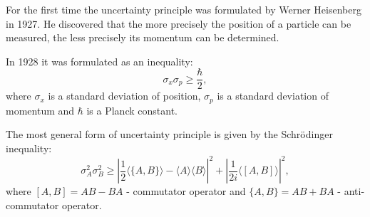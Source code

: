 \documentclass[%
master,         %
subf,           %
href,           %
colorlinks=true %
]{disser}
\numberwithin{equation}{section}
\numberwithin{figure}{section}
\begin{document}
For the first time the uncertainty principle was formulated by Werner Heisenberg in 1927. He discovered that the more precisely the position of a particle can be measured, the less precisely its momentum can be determined.

In 1928 it was formulated as an inequality:
\[
\sigma_x\sigma_p \geq \frac{\hbar}{2},
\]
where $\sigma_x$ is a standard deviation of position, $\sigma_p$ is a standard deviation of momentum and $\hbar$ is a Planck constant.

The most general form of uncertainty principle is given by the Schr\"{o}dinger inequality:
\begin{equation}
\sigma_A^2\sigma_B^2 \geq \left| \frac{1}{2}\langle\{A, B\}\rangle - \langle A\rangle\langle B\rangle \right|^2 + \left| \frac{1}{2i}\langle [A, B]\rangle\right|^2,
\label{eq:Schrodinger_ineq}
\end{equation}
where $[A, B] = AB - BA$ - commutator operator and $\{A, B\} = AB + BA$ - anti-commutator operator.
\end{document}
